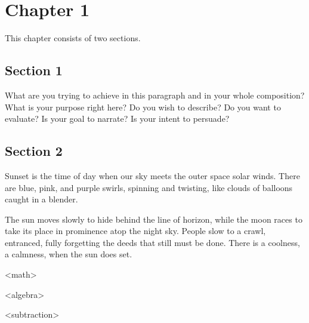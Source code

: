 \chapter{Chapter 1}
\label{chapter:1}
This chapter consists of two sections.

\section{Section 1}
\label{section:1}

What are you trying to achieve in this paragraph and in your whole composition? What is your purpose right here? Do you wish to describe? Do you want to evaluate? Is your goal to narrate? Is your intent to persuade?

\section{Section 2}
\label{section:2}

Sunset is the time of day when our sky meets the outer space solar winds. There are blue, pink, and purple swirls, spinning and twisting, like clouds of balloons caught in a blender.

The sun moves slowly to hide behind the line of horizon, while the moon races to take its place in prominence atop the night sky. People slow to a crawl, entranced, fully forgetting the deeds that still must be done. There is a coolness, a calmness, when the sun does set.

\begin{concepthierarchy}
    \begin{concept}<math>
    \label{concept:math}
        \begin{concept}<algebra>
        \label{concept:algebra}
        \end{concept}
        \begin{concept}<subtraction>
        \label{concept:subtraction}
        \end{concept}
    \end{concept}
\end{concepthierarchy}
